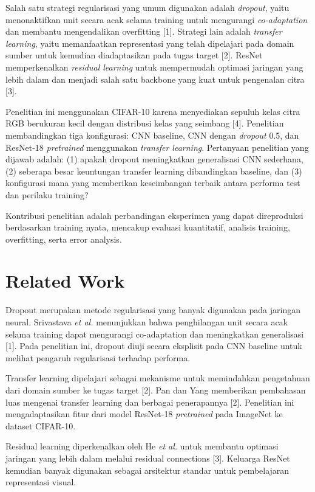 \documentclass[conference,a4paper]{IEEEtran}
\begin{document}
Salah satu strategi regularisasi yang umum digunakan adalah \textit{dropout}, yaitu menonaktifkan unit secara acak selama training untuk mengurangi \textit{co-adaptation} dan membantu mengendalikan overfitting [1]. Strategi lain adalah \textit{transfer learning}, yaitu memanfaatkan representasi yang telah dipelajari pada domain sumber untuk kemudian diadaptasikan pada tugas target [2]. ResNet memperkenalkan \textit{residual learning} untuk mempermudah optimasi jaringan yang lebih dalam dan menjadi salah satu backbone yang kuat untuk pengenalan citra [3].

Penelitian ini menggunakan CIFAR-10 karena menyediakan sepuluh kelas citra RGB berukuran kecil dengan distribusi kelas yang seimbang [4]. Penelitian membandingkan tiga konfigurasi: CNN baseline, CNN dengan \textit{dropout} 0.5, dan ResNet-18 \textit{pretrained} menggunakan \textit{transfer learning}. Pertanyaan penelitian yang dijawab adalah: (1) apakah dropout meningkatkan generalisasi CNN sederhana, (2) seberapa besar keuntungan transfer learning dibandingkan baseline, dan (3) konfigurasi mana yang memberikan keseimbangan terbaik antara performa test dan perilaku training?

Kontribusi penelitian adalah perbandingan eksperimen yang dapat direproduksi berdasarkan training nyata, mencakup evaluasi kuantitatif, analisis training, overfitting, serta error analysis.

\section{Related Work}
Dropout merupakan metode regularisasi yang banyak digunakan pada jaringan neural. Srivastava \textit{et al.} menunjukkan bahwa penghilangan unit secara acak selama training dapat mengurangi co-adaptation dan meningkatkan generalisasi [1]. Pada penelitian ini, dropout diuji secara eksplisit pada CNN baseline untuk melihat pengaruh regularisasi terhadap performa.

Transfer learning dipelajari sebagai mekanisme untuk memindahkan pengetahuan dari domain sumber ke tugas target [2]. Pan dan Yang memberikan pembahasan luas mengenai transfer learning dan berbagai penerapannya [2]. Penelitian ini mengadaptasikan fitur dari model ResNet-18 \textit{pretrained} pada ImageNet ke dataset CIFAR-10.

Residual learning diperkenalkan oleh He \textit{et al.} untuk membantu optimasi jaringan yang lebih dalam melalui residual connections [3]. Keluarga ResNet kemudian banyak digunakan sebagai arsitektur standar untuk pembelajaran representasi visual.
\end{document}
